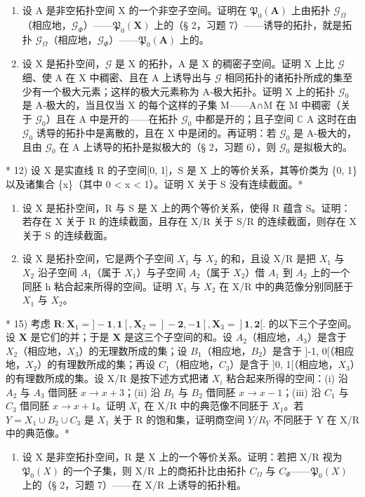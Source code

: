 \begin{enumerate}
\def\labelenumi{\arabic{enumi})}
\setcounter{enumi}{9}
\item
  设 A 是非空拓扑空间 X 的一个非空子空间。证明在 \(\mathfrak{P}_{0}(\mathbf{A})\) 上由拓扑 \(\mathcal{G}_{\Omega}\)（相应地，\(\mathcal{G}_{\Phi}\)）——\(\mathfrak{P}_{0}(\mathbf{X})\) 上的（§ 2，习题 7）——诱导的拓扑，就是拓扑 \(\mathcal{G}_{\Omega}\)（相应地，\(\mathcal{G}_{\Phi}\)）——\(\mathfrak{P}_{0}(\mathbf{A})\) 上的。
\item
  设 X 是拓扑空间，\(\mathcal{G}\) 是 X 的拓扑，A 是 X 的稠密子空间。证明 X 上比 \(\mathcal{G}\) 细、使 A 在 X 中稠密、且在 A 上诱导出与 \(\mathcal{G}\) 相同拓扑的诸拓扑所成的集至少有一个极大元素；这样的极大元素称为 A-极大拓扑。证明 X 上的拓扑 \(\mathcal{G}_0\) 是 A-极大的，当且仅当 X 的每个这样的子集 M——A∩M 在 M 中稠密（关于 \(\mathcal{G}_0\)）且在 A 中是开的——在拓扑 \(\mathcal{G}_0\) 中都是开的；且子空间 \(\mathbb{C}\) A 这时在由 \(\mathcal{G}_0\) 诱导的拓扑中是离散的，且在 X 中是闭的。再证明：若 \(\mathcal{G}_0\) 是 A-极大的，且由 \(\mathcal{G}_0\) 在 A 上诱导的拓扑是拟极大的（§ 2，习题 6），则 \(\mathcal{G}_0\) 是拟极大的。
\end{enumerate}

* 12) 设 X 是实直线 R 的子空间{[}0, 1{]}，S 是 X 上的等价关系，其等价类为 \{0, 1\} 以及诸集合 \{x\}（其中 0 \textless{} x \textless{} 1）。证明 X 关于 S 没有连续截面。*

\begin{enumerate}
\def\labelenumi{\arabic{enumi})}
\setcounter{enumi}{12}
\item
  设 X 是拓扑空间，R 与 S 是 X 上的两个等价关系，使得 R 蕴含 S。证明：若存在 X 关于 R 的连续截面，且存在 X/R 关于 S/R 的连续截面，则存在 X 关于 S 的连续截面。
\item
  设 X 是拓扑空间，它是两个子空间 \(X_{1}\) 与 \(X_{2}\) 的和，且设 X/R 是把 \(X_{1}\) 与 \(X_{2}\) 沿子空间 \(A_{1}\)（属于 \(X_{1}\)）与子空间 \(A_{2}\)（属于 \(X_{2}\)）借 \(A_{1}\) 到 \(A_{2}\) 上的一个同胚 h 粘合起来所得的空间。证明 \(X_{1}\) 与 \(X_{2}\) 在 X/R 中的典范像分别同胚于 \(X_{1}\) 与 \(X_{2}\)。
\end{enumerate}

* 15) 考虑 \(\mathbf{R}: \mathbf{X}_1 = ] - \mathbf{1}, \mathbf{1}[, \mathbf{X}_2 = ] - \mathbf{2}, -\mathbf{1}[, \mathbf{X}_3 = ]\mathbf{1}, \mathbf{2}[.\) 的以下三个子空间。设 \(\mathbf{X}\) 是它们的并；于是 \(\mathbf{X}\) 是这三个子空间的和。设 \(A_{2}\)（相应地，\(A_{3}\)）是含于 \(X_{2}\)（相应地，\(X_{3}\)）的无理数所成的集；设 \(B_{1}\)（相应地，\(B_{2}\)）是含于 {]}-1, 0{[}（相应地，\(X_{2}\)）的有理数所成的集；再设 \(C_{1}\)（相应地，\(C_{3}\)）是含于 {]}0, 1{[}（相应地，\(X_{3}\)）的有理数所成的集。设 X/R 是按下述方式把诸 \(X_{i}\) 粘合起来所得的空间：(i) 沿 \(A_{2}\) 与 \(A_{3}\) 借同胚 \(x \to x + 3\)；(ii) 沿 \(B_{1}\) 与 \(B_{2}\) 借同胚 \(x \to x - 1\)；(iii) 沿 \(C_{1}\) 与 \(C_{3}\) 借同胚 \(x \to x + 1\)。证明 \(X_{1}\) 在 X/R 中的典范像不同胚于 \(X_{1}\)。若 \(Y = X_{1} \cup B_{2} \cup C_{3}\) 是 \(X_{1}\) 关于 R 的饱和集，证明商空间 \(Y/R_{Y}\) 不同胚于 Y 在 X/R 中的典范像。*

\begin{enumerate}
\def\labelenumi{\arabic{enumi})}
\setcounter{enumi}{15}
\tightlist
\item
  设 X 是非空拓扑空间，R 是 X 上的一个等价关系。证明：若把 X/R 视为 \(\mathfrak{P}_{0}(X)\) 的一个子集，则 X/R 上的商拓扑比由拓扑 \(C_{\Omega}\) 与 \(C_{\Phi}\)——\(\mathfrak{P}_{0}(X)\) 上的（§ 2，习题 7）——在 X/R 上诱导的拓扑粗。
\end{enumerate}

